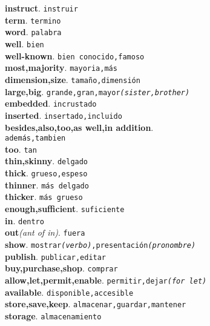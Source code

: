 \documentclass[twocolumn]{article}
\begin{document}
	\textsf{\textbf{instruct}}. \texttt{instruir}\\
	\textsf{\textbf{term}}. \texttt{termino}\\
	\textsf{\textbf{word}}. \texttt{palabra}\\
	\textsf{\textbf{well}}. \texttt{bien}\\
	\textsf{\textbf{well-known}}. \texttt{bien conocido,famoso}\\
	\textsf{\textbf{most,majority}}. \texttt{mayoria,m\'as}\\
	\textsf{\textbf{dimension,size}}. \texttt{tama\~no,dimensi\'on}\\
	\textsf{\textbf{large,big}}. \texttt{grande,gran,mayor{\scriptsize \textsl{(sister,brother)}}}\\
	\textsf{\textbf{embedded}}. \texttt{incrustado}\\
	\textsf{\textbf{inserted}}. \texttt{insertado,incluido}\\
	\textsf{\textbf{besides,also,too,as well,in addition}}.\\\texttt{adem\'as,tambien}\\
	\textsf{\textbf{too}}. \texttt{tan}\\
	\textsf{\textbf{thin,skinny}}. \texttt{delgado}\\
	\textsf{\textbf{thick}}. \texttt{grueso,espeso}\\
	\textsf{\textbf{thinner}}. \texttt{m\'as delgado}\\
	\textsf{\textbf{thicker}}. \texttt{m\'as grueso}\\
	\textsf{\textbf{enough,sufficient}}. \texttt{suficiente}\\
	\textsf{\textbf{in}}. \texttt{dentro}\\
	\textsf{\textbf{out}}{\scriptsize \textsl{(ant of in)}}. \texttt{fuera}\\
	\textsf{\textbf{show}}. \texttt{mostrar{\scriptsize \textsl{(verbo)}},presentaci\'on{\scriptsize \textsl{(pronombre)}}}\\
	\textsf{\textbf{publish}}. \texttt{publicar,editar}\\
	\textsf{\textbf{buy,purchase,shop}}. \texttt{comprar}\\
	\textsf{\textbf{allow,let,permit,enable}}. \texttt{permitir,dejar{\scriptsize \textsl{(for let)}}}\\
	\textsf{\textbf{available}}. \texttt{disponible,accesible}\\
	\textsf{\textbf{store,save,keep}}. \texttt{almacenar,guardar,mantener}\\
	\textsf{\textbf{storage}}. \texttt{almacenamiento}\\
\end{document}
